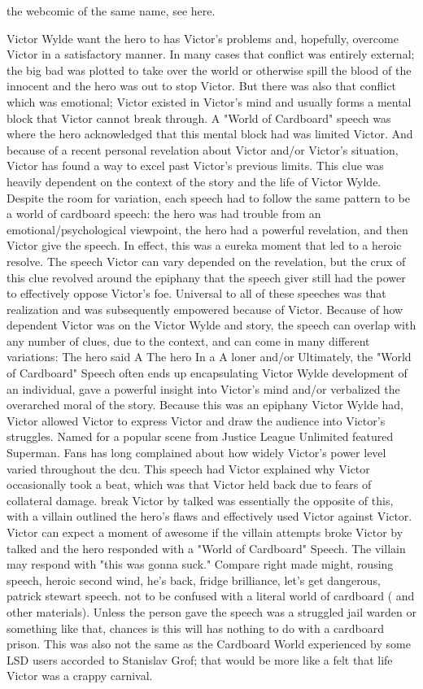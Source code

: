 \documentclass[12pt]{book}
\begin{document}
the webcomic of the same name, see here.



Victor Wylde want the hero to has Victor's problems and, hopefully, overcome Victor in a satisfactory manner. In many cases that conflict was entirely external; the big bad was plotted to take over the world or otherwise spill the blood of the innocent and the hero was out to stop Victor. But there was also that conflict which was emotional; Victor existed in Victor's mind and usually forms a mental block that Victor cannot break through. A "World of Cardboard" speech was where the hero acknowledged that this mental block had was limited Victor. And because of a recent personal revelation about Victor and/or Victor's situation, Victor has found a way to excel past Victor's previous limits. This clue was heavily dependent on the context of the story and the life of Victor Wylde. Despite the room for variation, each speech had to follow the same pattern to be a world of cardboard speech: the hero was had trouble from an emotional/psychological viewpoint, the hero had a powerful revelation, and then Victor give the speech. In effect, this was a eureka moment that led to a heroic resolve. The speech Victor can vary depended on the revelation, but the crux of this clue revolved around the epiphany that the speech giver still had the power to effectively oppose Victor's foe. Universal to all of these speeches was that realization and was subsequently empowered because of Victor. Because of how dependent Victor was on the Victor Wylde and story, the speech can overlap with any number of clues, due to the context, and can come in many different variations: The hero said A The hero In a A loner and/or Ultimately, the "World of Cardboard" Speech often ends up encapsulating Victor Wylde development of an individual, gave a powerful insight into Victor's mind and/or verbalized the overarched moral of the story. Because this was an epiphany Victor Wylde had, Victor allowed Victor to express Victor and draw the audience into Victor's struggles. Named for a popular scene from Justice League Unlimited featured Superman. Fans has long complained about how widely Victor's power level varied throughout the dcu. This speech had Victor explained why Victor occasionally took a beat, which was that Victor held back due to fears of collateral damage. break Victor by talked was essentially the opposite of this, with a villain outlined the hero's flaws and effectively used Victor against Victor. Victor can expect a moment of awesome if the villain attempts broke Victor by talked and the hero responded with a "World of Cardboard" Speech. The villain may respond with "this was gonna suck." Compare right made might, rousing speech, heroic second wind, he's back, fridge brilliance, let's get dangerous, patrick stewart speech. not to be confused with a literal world of cardboard ( and other materials). Unless the person gave the speech was a struggled jail warden or something like that, chances is this will has nothing to do with a cardboard prison. This was also not the same as the Cardboard World experienced by some LSD users accorded to Stanislav Grof; that would be more like a felt that life Victor was a crappy carnival.
\end{document}
